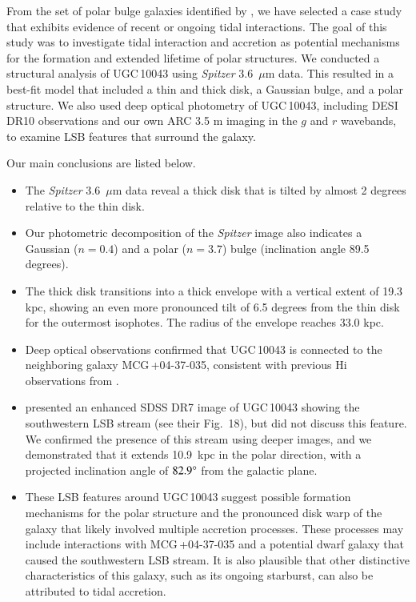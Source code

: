 \documentclass[letter]{aa}
\begin{document}
From the set of polar bulge galaxies identified by \citet{2015AstL...41..748R}, we have selected a case study that exhibits evidence of recent or ongoing tidal interactions. The goal of this study was to investigate tidal interaction and accretion as potential mechanisms for the formation and extended lifetime of polar structures. We conducted a structural analysis of UGC\,10043 using {\it Spitzer} 3.6~$\mu$m data. This resulted in a best-fit model that included a thin and thick disk, a Gaussian bulge, and a polar structure. We also used deep optical photometry of UGC\,10043, including DESI DR10 observations and our own ARC 3.5 m imaging in the $g$ and $r$ wavebands, to examine LSB features that surround the galaxy.

Our main conclusions are listed below.

\begin{itemize}
    \item The {\it Spitzer} 3.6~$\mu$m data reveal a thick disk that is tilted by almost 2 degrees relative to the thin disk.  
    \item Our photometric decomposition of the {\it Spitzer} image also indicates a Gaussian ($n=0.4$) and a polar ($n=3.7$) bulge (inclination angle 89.5 degrees). 
    \item The thick disk transitions into a thick envelope with a vertical extent of 19.3 kpc, showing an even more pronounced tilt of 6.5 degrees from the thin disk for the outermost isophotes. The radius of the envelope reaches 33.0 kpc.  
    \item Deep optical observations confirmed that UGC\,10043 is connected to the neighboring galaxy MCG\,+04-37-035, consistent with previous H{\sc i} observations from \citet{aguirre09}.  
    \item \citet{2011A&A...536A..66M} presented an enhanced SDSS DR7 image of UGC\,10043 showing the southwestern LSB stream (see their Fig.~18), but did not discuss this feature. We confirmed the presence of this stream using deeper images, and we demonstrated that it extends 10.9~kpc in the polar direction, with a projected inclination angle of $82.9\degree$ from the galactic plane.   
    \item These LSB features around UGC\,10043 suggest possible formation mechanisms for the polar structure and the pronounced disk warp of the galaxy that likely involved multiple accretion processes. These processes may include interactions with MCG\,+04-37-035 and a potential dwarf galaxy that caused the southwestern LSB stream. It is also plausible that other distinctive characteristics of this galaxy, such as its ongoing starburst, can also be attributed to tidal accretion. 
\end{itemize}
\end{document}
